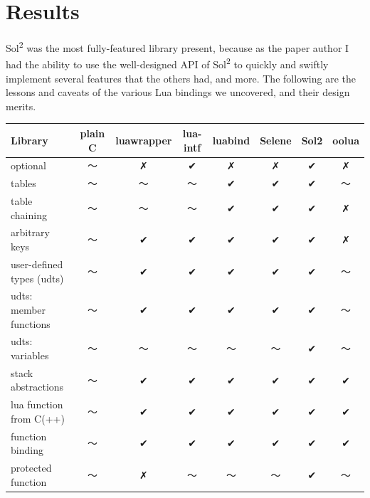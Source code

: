 \documentclass[conference,compsoc]{IEEEtran}
\newcommand{\soltwo}{Sol\textsuperscript{2}}
\begin{document}
\section{Results}

\soltwo{} was the most fully-featured library present, because as the paper author I had the ability to use the well-designed API of \soltwo{} to quickly and swiftly implement several features that the others had, and more. The following are the lessons and caveats of the various Lua bindings we uncovered, and their design merits.

\begin{table}[ht!]
	\centering
	\begin{tabular}{l c c c c c c c }
		Library                   &   plain C   & luawrapper & lua-intf & luabind &  Selene  &    Sol2   &   oolua   
		\\ \hline
		optional                  &      〜      &     ✗      &     ✔    &    ✗    &     ✗    &     ✔     &     ✗     
		\\ \hline
		tables                    &      〜      &     〜      &     〜    &    ✔    &     ✔    &     ✔     &     〜     
		\\ \hline
		table chaining            &      〜      &     〜      &     〜    &    ✔    &     ✔    &     ✔     &     ✗     
		\\ \hline
		arbitrary keys            &      〜      &     ✔      &     ✔    &    ✔    &     ✔    &     ✔     &     ✗     
		\\ \hline
		user-defined types (udts) &      〜      &     ✔      &     ✔    &    ✔    &     ✔    &     ✔     &     〜     
		\\ \hline
		udts: member functions    &      〜      &     ✔      &     ✔    &    ✔    &     ✔    &     ✔     &     〜     
		\\ \hline
		udts: variables           &      〜      &     〜      &     〜    &    〜    &     〜    &     ✔     &     〜     
		\\ \hline
		stack abstractions        &      〜      &     ✔      &     ✔    &    ✔    &     ✔    &     ✔     &     ✔     
		\\ \hline
		lua function from C(++)   &      〜      &     ✔      &     ✔    &    ✔    &     ✔    &     ✔     &     ✔     
		\\ \hline
		function binding          &      〜      &     ✔      &     ✔    &    ✔    &     ✔    &     ✔     &     ✔     
		\\ \hline
		protected function        &      〜      &     ✗      &     〜    &    〜    &     〜    &     ✔     &     〜     

\end{tabular}
\end{table}
\end{document}
